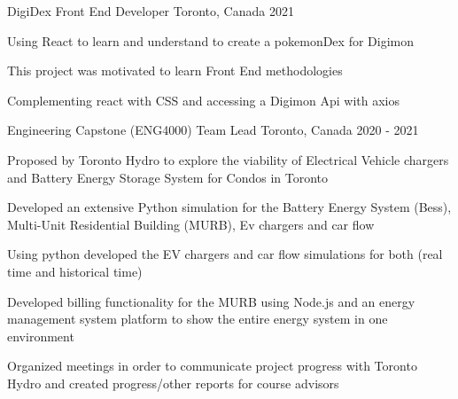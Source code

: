 


\begin{cventries}


% 


\cventry
{DigiDex} %
{Front End Developer} %
{Toronto, Canada} %
{2021} %
{ %
\begin{cvitems}
\item {Using React to learn and understand to create a pokemonDex for Digimon}
\item {This project was motivated to learn Front End methodologies}
\item {Complementing react with CSS and accessing a Digimon Api with axios}
\end{cvitems}
}


\cventry
{Engineering Capstone (ENG4000)} %
{Team Lead} %
{Toronto, Canada} %
{2020 - 2021} %
{ %
\begin{cvitems}
\item {Proposed by Toronto Hydro to explore the viability of Electrical Vehicle chargers and Battery Energy Storage System for Condos in Toronto}
\item {Developed an extensive Python simulation for the Battery Energy System (Bess), Multi-Unit Residential Building (MURB), Ev chargers and car flow}
\item {Using python developed the EV chargers and car flow simulations for both (real time and historical time)}
\item {Developed billing functionality for the MURB using Node.js and an energy management system platform to show the entire energy system in one environment}
\item {Organized meetings in order to communicate project progress with Toronto Hydro and created progress/other reports for course advisors}
\end{cvitems}
}



\end{cventries}